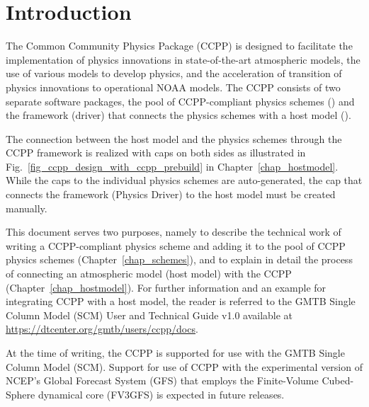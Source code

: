 \chapter{Introduction}\label{chap_introduction}
\setlength{\parskip}{12pt}

The Common Community Physics Package (CCPP) is designed to facilitate the implementation of physics innovations in state-of-the-art atmospheric models, the use of various models to develop physics, and the acceleration of transition of physics innovations to operational NOAA models. The CCPP consists of two separate software packages, the pool of CCPP-compliant physics schemes () and the framework (driver) that connects the physics schemes with a host model ().

The connection between the host model and the physics schemes through the CCPP framework is realized with caps on both sides as illustrated in Fig.~\ref{fig_ccpp_design_with_ccpp_prebuild} in Chapter~\ref{chap_hostmodel}. While the caps to the individual physics schemes are auto-generated, the cap that connects the framework (Physics Driver) to the host model must be created manually.

This document serves two purposes, namely to describe the technical work of writing a CCPP-compliant physics scheme and adding it to the pool of CCPP physics schemes (Chapter~\ref{chap_schemes}), and to explain in detail the process of connecting an atmospheric model (host model) with the CCPP (Chapter~\ref{chap_hostmodel}). For further information and an example for integrating CCPP with a host model, the reader is referred to the GMTB Single Column Model (SCM) User and Technical Guide v1.0 available at {\url{https://dtcenter.org/gmtb/users/ccpp/docs}}.

At the time of writing, the CCPP is supported for use with the GMTB Single Column Model (SCM). Support for use of CCPP with the experimental version of NCEP's Global Forecast System (GFS) that employs the Finite-Volume Cubed-Sphere dynamical core (FV3GFS) is expected in future releases. 

